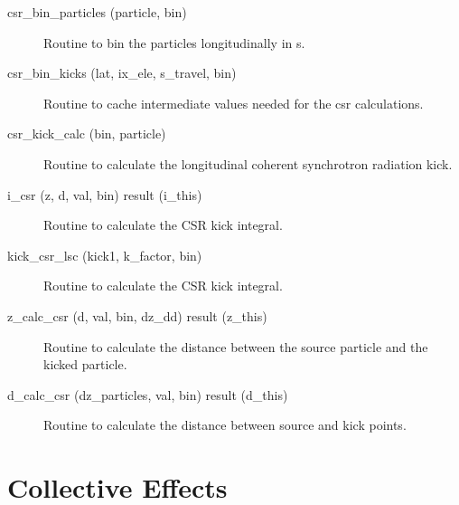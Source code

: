 \begin{description}

\label{r:csr.bin.particles}
\item[csr_bin_particles (particle, bin)] \Newline 
Routine to bin the particles longitudinally in s. 

\label{r:csr.bin.kicks}
\item[csr_bin_kicks (lat, ix_ele, s_travel, bin)] \Newline 
Routine to cache intermediate values needed for the csr calculations.

\label{r:csr.kick.calc}
\item[csr_kick_calc (bin, particle)] \Newline 
Routine to calculate the longitudinal coherent synchrotron radiation kick.

\label{r:i.csr}
\item[i_csr (z, d, val, bin) result (i_this)] \Newline 
Routine to calculate the CSR kick integral.

\label{r:kick.csr.lsc}
\item[kick_csr_lsc (kick1, k_factor, bin)] \Newline 
Routine to calculate the CSR kick integral.

\label{r:z.calc.csr}
\item[z_calc_csr (d, val, bin, dz_dd) result (z_this)] \Newline 
Routine to calculate the distance between the source particle and the
kicked particle.

\label{r:d.calc.csr}
\item[d_calc_csr (dz_particles, val, bin) result (d_this)] \Newline 
Routine to calculate the distance between source and kick points.

\end{description}

\section{Collective Effects}
\label{r:collective}

